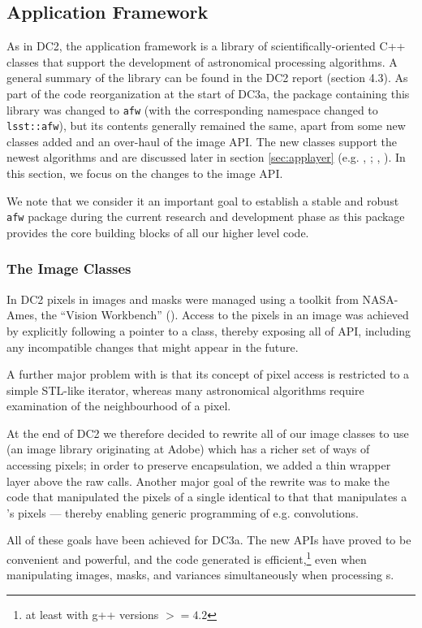 \subsection{Application Framework}

As in DC2, the application framework is a library of
scientifically-oriented C++ classes that support the development of
astronomical processing algorithms.  A general summary of the library
can be found in the DC2 report (section 4.3).  As part of the code
reorganization at the start of DC3a, the package containing this
library was changed to {\tt afw} (with the corresponding namespace 
changed to {\tt lsst::afw}), but its contents generally remained the
same, apart from some new classes added and an over-haul of the image
API.  The new classes support the newest algorithms and are discussed
later in section \ref{sec:applayer} (e.g. ,
; , ).  In this section, we
focus on the changes to the image API.  

We note that we consider it an important goal to establish a stable
and robust {\tt afw} package during the current research and
development phase as this package provides the core building blocks of
all our higher level code.

\subsubsection{The Image Classes}
\label{secImageClasses}

In DC2 pixels in images and masks were managed using a toolkit from NASA-Ames, the ``Vision Workbench'' ().
Access to the pixels in an image was achieved by explicitly following a pointer to a  class,
thereby exposing all of  API, including any incompatible changes that might appear in
the future.

A further major problem with  is that its concept of pixel access is restricted to a simple
STL-like iterator, whereas many astronomical algorithms require examination of the neighbourhood of
a pixel.

At the end of DC2 we therefore decided to rewrite all of our image classes to use 
(an image library originating at Adobe) which has a richer set of ways of accessing pixels;  in
order to preserve encapsulation, we added a thin wrapper layer above the raw  calls.
Another major goal of the rewrite was to make the code that manipulated the pixels of a single
 identical to that that manipulates a 's pixels --- thereby enabling
generic programming of e.g. convolutions.

All of these goals have been achieved for DC3a.  The new APIs have proved to be convenient and
powerful, and the code generated is efficient,\footnote{at least with g++ versions $>= 4.2$} even when
manipulating images, masks, and variances simultaneously when processing s.

